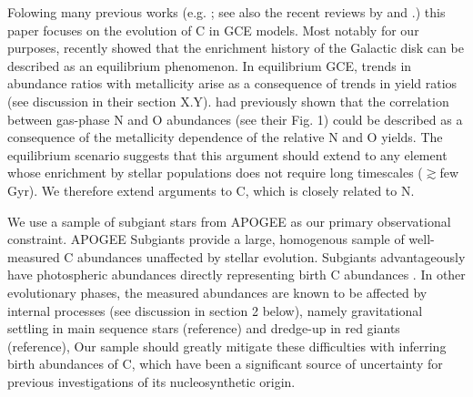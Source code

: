 \documentclass[fleqn,
usenatbib]{mnras}
\makeatletter
\DeclareRobustCommand\citepos
  {\begingroup
   \let\NAT@nmfmt\NAT@posfmt%
   \NAT@swafalse\let\NAT@ctype\z@\NAT@partrue
   \@ifstar{\NAT@fulltrue\NAT@citetp}{\NAT@fullfalse\NAT@citetp}}
\let\NAT@orig@nmfmt\NAT@nmfmt
\def\NAT@posfmt#1{\NAT@orig@nmfmt{#1's}}
\newcommand{\note}[1]{{\color{ForestGreen} \textit{ \small (JWJ: #1)}}}
\newcommand{\dbstrike}[1]{{\color{Thistle} \sout{#1}}}
\newcommand{\dbadd}[1]{{\color{Thistle} #1}}
\newcommand{\dbnote}[1]{ {\color{Thistle} \textit{\small (DB: #1)}} }
\makeatother
\begin{document}
 Folowing many previous works  (e.g. \citealt{DTS78, BF06, prantzos+18, berg+19}; see also the recent reviews by \citealt{romano22} and \citealt{RM21}.) this paper focuses on the evolution of C in GCE models.
Most notably for our purposes, \citet{james+23} recently showed that the enrichment history of the Galactic disk can be described as an equilibrium phenomenon.
In equilibrium GCE, trends in abundance ratios with metallicity arise as a consequence of trends in yield ratios (see discussion in their section {\color{red} X.Y}).
\citet{james+23} had previously shown that the correlation between gas-phase N and O abundances (see their Fig. 1) could be described as a consequence of the metallicity dependence of the relative N and O yields.
The equilibrium scenario suggests that this argument should extend to any element whose enrichment by stellar populations does not require long timescales ($\gtrsim$few Gyr).
We therefore extend \citepos{james+23} arguments to C, which is closely related to N.


We use a sample of subgiant stars from APOGEE \citep{apogee17} as our primary observational constraint.
\dbadd{APOGEE Subgiants provide a large, homogenous sample of well-measured C abundances unaffected by stellar evolution}.
Subgiants advantageously have photospheric abundances directly representing birth C abundances \citep{gilroy89, korn+07, lind+08, souto+18, souto19}.
In other evolutionary phases, the measured abundances are known to be affected by internal processes (see discussion in section 2 below), namely gravitational settling in main sequence stars {\color{red} (reference)} and dredge-up in red giants {\color{red} (reference)}, 
Our sample should greatly mitigate these difficulties with inferring birth abundances of C, which have been a significant source of uncertainty for previous investigations of its nucleosynthetic origin.

\end{document}
